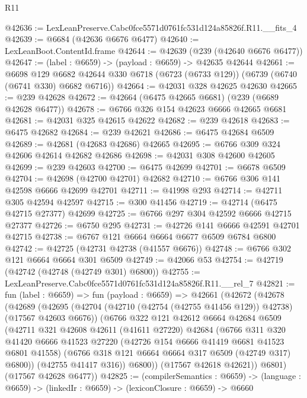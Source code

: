 \begin{lexlean}{R11}
\begin{coremodule}
@42636 := LexLeanPreserve.Cabc0fce5571d0761fc531d124a85826f.R11.__fits_4
@42639 := @6684 (@42636 @6676 @6477)
@42640 := LexLeanBoot.ContentId.frame
@42644 := @42639 (@239 (@42640 @6676 @6477))
@42647 := (label : @6659) -> (payload : @6659) -> @42635 @42644
@42661 := @6698
    @129
    @6682
    @42644
    @330
    @6718
    (@6723 (@6733 @129))
    (@6739 (@6740 (@6741 @330) @6682 @6716))
@42664 := @42031 @328 @42625 @42630
@42665 := @239 @42628
@42672 := @42664 (@6475 @42665 @6681) (@239 (@6689 @42628 @6477))
@42678 := @6766 @326 @154 @42623 @6666 @42665 @6681
@42681 := @42031 @325 @42615 @42622
@42682 := @239 @42618
@42683 := @6475 @42682
@42684 := @239 @42621
@42686 := @6475 @42684 @6509
@42689 := @42681 (@42683 @42686) @42665
@42695 := @6766 @309 @324 @42606 @42614 @42682 @42686
@42698 := @42031 @308 @42600 @42605
@42699 := @239 @42603
@42700 := @6475 @42699
@42701 := @6678 @6509
@42704 := @42698 (@42700 @42701) @42682
@42710 := @6766 @306 @141 @42598 @6666 @42699 @42701
@42711 := @41998 @293
@42714 := @42711 @305 @42594 @42597
@42715 := @300 @41456
@42719 := @42714 (@6475 @42715 @27377) @42699
@42725 := @6766 @297 @304 @42592 @6666 @42715 @27377
@42726 := @6750 @295
@42731 := @42726 @141 @6666 @42591 @42701 @42715
@42738 := @6767 @121 @6664 @6664 @6677 @6509 @6784 @6800
@42742 := @42725 (@42731 @42738 (@41557 @6676))
@42748 := @6766 @302 @121 @6664 @6664 @301 @6509
@42749 := @42066 @53
@42754 := @42719 (@42742 (@42748 (@42749 @301) @6800))
@42755 := LexLeanPreserve.Cabc0fce5571d0761fc531d124a85826f.R11.__rel_7
@42821 := fun (label : @6659) =>
  fun (payload : @6659) =>
  @42661
    (@42672
      (@42678
        (@42689
          (@42695
            (@42704 (@42710 (@42754 (@42755 @41456 @129)) @42738) (@17567 @42603 @6676))
            (@6766
              @322
              @121
              @42612
              @6664
              @42684
              @6509
              (@42711
                @321
                @42608
                @42611
                (@41611 @27220)
                @42684
                (@6766
                  @311
                  @320
                  @41420
                  @6666
                  @41523
                  @27220
                  (@42726 @154 @6666 @41419 @6681 @41523 @6801 @41558)
                  (@6766 @318 @121 @6664 @6664 @317 @6509 (@42749 @317) @6800))
                (@42755 @41417 @316))
              @6800))
          (@17567 @42618 @42621))
        @6801)
      (@17567 @42628 @6477))
@42825 := (compilerSemantics : @6659) ->
  (language : @6659) -> (linkedIr : @6659) -> (lexiconClosure : @6659) -> @6660

\end{coremodule}
\end{lexlean}
